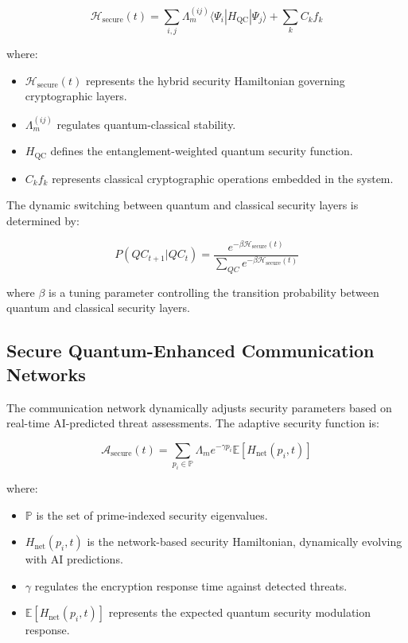 \documentclass{article}
\theoremstyle{plain}
\begin{document}
\begin{equation}
    \mathcal{H}_{\text{secure}}(t) = \sum_{i,j} \Lambda_m^{(ij)} \langle \Psi_i | H_{\text{QC}} | \Psi_j \rangle + \sum_{k} C_k f_k
\end{equation}

where:
\begin{itemize}
    \item $\mathcal{H}_{\text{secure}}(t)$ represents the hybrid security Hamiltonian governing cryptographic layers.
    \item $\Lambda_m^{(ij)}$ regulates quantum-classical stability.
    \item $H_{\text{QC}}$ defines the entanglement-weighted quantum security function.
    \item $C_k f_k$ represents classical cryptographic operations embedded in the system.
\end{itemize}

The dynamic switching between quantum and classical security layers is determined by:

\begin{equation}
    P(QC_{t+1} | QC_t) = \frac{e^{-\beta \mathcal{H}_{\text{secure}}(t)}}{\sum_{QC} e^{-\beta \mathcal{H}_{\text{secure}}(t)}}
\end{equation}

where $\beta$ is a tuning parameter controlling the transition probability between quantum and classical security layers.

\subsection{Secure Quantum-Enhanced Communication Networks}

The communication network dynamically adjusts security parameters based on real-time AI-predicted threat assessments. The adaptive security function is:

\begin{equation}
    \mathcal{A}_{\text{secure}}(t) = \sum_{p_i \in \mathbb{P}} \Lambda_m e^{-\gamma p_i} \mathbb{E}[H_{\text{net}}(p_i, t)]
\end{equation}

where:
\begin{itemize}
    \item $\mathbb{P}$ is the set of prime-indexed security eigenvalues.
    \item $H_{\text{net}}(p_i, t)$ is the network-based security Hamiltonian, dynamically evolving with AI predictions.
    \item $\gamma$ regulates the encryption response time against detected threats.
    \item $\mathbb{E}[H_{\text{net}}(p_i, t)]$ represents the expected quantum security modulation response.
\end{itemize}
\end{document}
